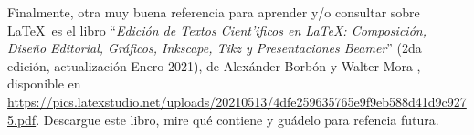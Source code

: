 \documentclass[11pt]{exam}
\begin{document}
\begin{questions}
\item Finalmente, otra muy buena referencia para aprender y/o consultar sobre \LaTeX\ es el libro ``\textit{Edición de Textos Cient'ificos en \LaTeX: Composición, Dise\~no Editorial, Gráficos, Inkscape, Tikz y Presentaciones Beamer}'' (2da edición, actualización Enero 2021), de Alexánder Borbón y Walter Mora , disponible en \url{https://pics.latexstudio.net/uploads/20210513/4dfe259635765e9f9eb588d41d9c9275.pdf}. Descargue este libro, mire qué contiene y guádelo para refencia futura.
\end{questions}
\end{document}
